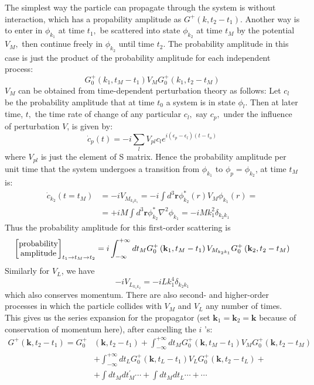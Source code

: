 The simplest way the particle can propagate through the system is without interaction, which has a propability amplitude as $G^+(k,t_2-t_1)$. Another way is to enter in $\phi_{k_{1}}$ at time $t_{1},$ be scattered into state $\phi_{k_{2}}$ at time $t_{M}$ by the potential $V_{M},$ then continue freely in $\phi_{k_{2}}$ until time $t_{2} .$ The probability amplitude in this case is just the product of the probability amplitude for each independent process:
$$
G^+_0(k_1,t_M-t_1)V_MG^+_0(k_1,t_2-t_M)
$$
$V_M$ can be obtained from time-dependent perturbation theory as follows: Let $c_{l}$ be the probability amplitude that at time $t_{0}$ a system is in state $\phi_{l} .$ Then at later time, $t,$ the time rate of change of any particular $c_{l},$ say $c_{p},$ under the influence of perturbation $V$, is given by:
\begin{equation}\dot{c}_{p}(t)=-i \sum_{l} V_{p l} c_{l} e^{i\left(\epsilon_{p}-\epsilon_{l}\right)\left(t-t_{o}\right)}\end{equation}
where $V_{pl}$ is just the element of S matrix. Hence the probability amplitude per unit time that the system undergoes a transition from $\phi_{k_1}$ to $\phi_p=\phi_{k_2}$, at time $t_M$ is:
\begin{equation}\begin{aligned}
\dot{c}_{k_{2}}\left(t=t_{M}\right) &=-i V_{M_{k_2 k_1}}=-i \int d^{3} \mathbf{r} \phi_{k_{2}}^{*}(r) V_{M} \phi_{k_{1}}(r)=\\
&=+i M \int d^{3} \mathbf{r} \phi_{k_{2}}^{*} \nabla^{2} \phi_{k_{1}}=-i M k_{1}^{2} \delta_{k_{2} k_{1}}
\end{aligned}\end{equation}
Thus the probability amplitude for this first-order scattering is 
\begin{equation}
    \left[\text{\stackanchor{probability}{amplitude}}\right]_{t_1\rightarrow t_M\rightarrow t_2}=i \int_{-\infty}^{+\infty} d t_{M} G_{0}^{+}\left(\mathbf{k}_{1}, t_{M}-t_{1}\right) V_{M_{k_2k_1}} G_{0}^{+}\left(\mathbf{k}_{2}, t_{2}-t_{M}\right)
\end{equation}
Similarly for $V_L$, we have
$$-i V_{L_{k_1k_2}}=-i L k_{1}^{4} \delta_{k_{2} k_{1}}$$
which also conserves momentum. There are also second- and higher-order processes in which the particle collides with $V_{M}$ and $V_{L}$ any number of times. This gives us the series expansion for the propagator (set $\mathbf{k}_{1}=\mathbf{k}_{2}=\mathbf{k}$ because of conservation of momentum here), after cancelling the $i$ 's:
$$\begin{aligned}
G^{+}\left(\mathbf{k}, t_{2}-t_{1}\right)=G_{0}^{+} &\left(\mathbf{k}, t_{2}-t_{1}\right)+\int_{-\infty}^{+\infty} d t_{M} G_{0}^{+}\left(\mathbf{k}, t_{M}-t_{1}\right) V_{M} G_{0}^{+}\left(\mathbf{k}, t_{2}-t_{M}\right) \\
&+\int_{-\infty}^{+\infty} d t_{L} G_{0}^{+}\left(\mathbf{k}, t_{L}-t_{1}\right) V_{L} G_{0}^{+}\left(\mathbf{k}, t_{2}-t_{L}\right)+\\
&+\int d t_{M} d t_{M}^{\prime} \cdots+\int d t_{M} d t_{L} \cdots+\cdots
\end{aligned}$$

